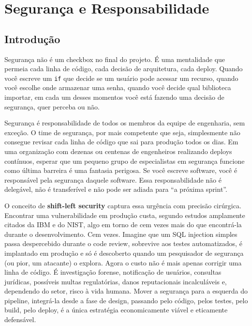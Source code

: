 \chapter{Segurança e Responsabilidade}

\section{Introdução}

Segurança não é um checkbox no final do projeto. É uma mentalidade que permeia
cada linha de código, cada decisão de arquitetura, cada deploy. Quando você escreve
um \texttt{if} que decide se um usuário pode acessar um recurso, quando você
escolhe onde armazenar uma senha, quando você decide qual biblioteca importar,
em cada um desses momentos você está fazendo uma decisão de segurança,
quer perceba ou não.

Segurança é responsabilidade de todos os membros da equipe de engenharia, sem
exceção. O time de segurança, por mais competente que seja, simplesmente não
consegue revisar cada linha de código que sai para produção todos os dias. Em uma
organização com dezenas ou centenas de engenheiros realizando deploys contínuos,
esperar que um pequeno grupo de especialistas em segurança funcione como última
barreira é uma fantasia perigosa. Se você escreve software, você é responsável
pela segurança daquele software. Essa responsabilidade não é delegável, não é
transferível e não pode ser adiada para ``a próxima sprint''.

O conceito de \textbf{shift-left security} captura essa urgência com precisão
cirúrgica. Encontrar uma vulnerabilidade em produção custa, segundo estudos
amplamente citados da IBM e do NIST, algo em torno de cem vezes mais do que
encontrá-la durante o desenvolvimento. Cem vezes. Imagine que um SQL injection
simples passa despercebido durante o code review, sobrevive aos testes
automatizados, é implantado em produção e só é descoberto quando um pesquisador
de segurança (ou pior, um atacante) o explora. Agora o custo não é mais
apenas corrigir uma linha de código. É investigação forense, notificação de
usuários, consultas jurídicas, possíveis multas regulatórias, danos
reputacionais incalculáveis e, dependendo do setor, risco à vida humana. Mover
a segurança para a esquerda do pipeline, integrá-la desde a fase de design,
passando pelo código, pelos testes, pelo build, pelo deploy, é a única
estratégia economicamente viável e eticamente defensável.

